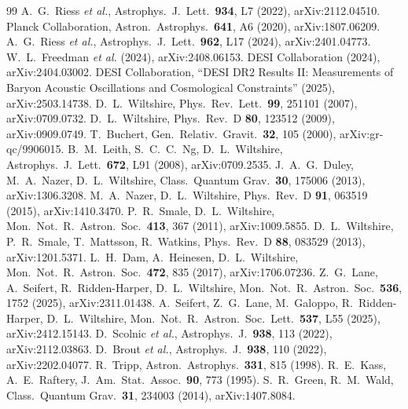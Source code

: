 \documentclass[aps,prd,twocolumn,nofootinbib,superscriptaddress,floatfix]{revtex4-2}
\begin{document}
\begin{thebibliography}{99}
 A.~G.~Riess \emph{et al.}, Astrophys.\ J.\ Lett.\ \textbf{934}, L7 (2022), arXiv:2112.04510.
 Planck Collaboration, Astron.\ Astrophys.\ \textbf{641}, A6 (2020), arXiv:1807.06209.
 A.~G.~Riess \emph{et al.}, Astrophys.\ J.\ Lett.\ \textbf{962}, L17 (2024), arXiv:2401.04773.
 W.~L.~Freedman \emph{et al.} (2024), arXiv:2408.06153.
 DESI Collaboration (2024), arXiv:2404.03002.
 DESI Collaboration, ``DESI DR2 Results II: Measurements of Baryon Acoustic Oscillations and Cosmological Constraints'' (2025), arXiv:2503.14738.
 D.~L.~Wiltshire, Phys.\ Rev.\ Lett.\ \textbf{99}, 251101 (2007), arXiv:0709.0732.
 D.~L.~Wiltshire, Phys.\ Rev.\ D \textbf{80}, 123512 (2009), arXiv:0909.0749.
 T.~Buchert, Gen.\ Relativ.\ Gravit.\ \textbf{32}, 105 (2000), arXiv:gr-qc/9906015.
 B.~M.~Leith, S.~C.~C.~Ng, D.~L.~Wiltshire, Astrophys.\ J.\ Lett.\ \textbf{672}, L91 (2008), arXiv:0709.2535.
 J.~A.~G.~Duley, M.~A.~Nazer, D.~L.~Wiltshire, Class.\ Quantum Grav.\ \textbf{30}, 175006 (2013), arXiv:1306.3208.
 M.~A.~Nazer, D.~L.~Wiltshire, Phys.\ Rev.\ D \textbf{91}, 063519 (2015), arXiv:1410.3470.
 P.~R.~Smale, D.~L.~Wiltshire, Mon.\ Not.\ R.\ Astron.\ Soc.\ \textbf{413}, 367 (2011), arXiv:1009.5855.
 D.~L.~Wiltshire, P.~R.~Smale, T.~Mattsson, R.~Watkins, Phys.\ Rev.\ D \textbf{88}, 083529 (2013), arXiv:1201.5371.
 L.~H.~Dam, A.~Heinesen, D.~L.~Wiltshire, Mon.\ Not.\ R.\ Astron.\ Soc.\ \textbf{472}, 835 (2017), arXiv:1706.07236.
 Z.~G.~Lane, A.~Seifert, R.~Ridden-Harper, D.~L.~Wiltshire, Mon.\ Not.\ R.\ Astron.\ Soc.\ \textbf{536}, 1752 (2025), arXiv:2311.01438.
 A.~Seifert, Z.~G.~Lane, M.~Galoppo, R.~Ridden-Harper, D.~L.~Wiltshire, Mon.\ Not.\ R.\ Astron.\ Soc.\ Lett.\ \textbf{537}, L55 (2025), arXiv:2412.15143.
 D.~Scolnic \emph{et al.}, Astrophys.\ J.\ \textbf{938}, 113 (2022), arXiv:2112.03863.
 D.~Brout \emph{et al.}, Astrophys.\ J.\ \textbf{938}, 110 (2022), arXiv:2202.04077.
 R.~Tripp, Astron.\ Astrophys.\ \textbf{331}, 815 (1998).
 R.~E.~Kass, A.~E.~Raftery, J.\ Am.\ Stat.\ Assoc.\ \textbf{90}, 773 (1995).
 S.~R.~Green, R.~M.~Wald, Class.\ Quantum Grav.\ \textbf{31}, 234003 (2014), arXiv:1407.8084.

\end{thebibliography}
\end{document}
